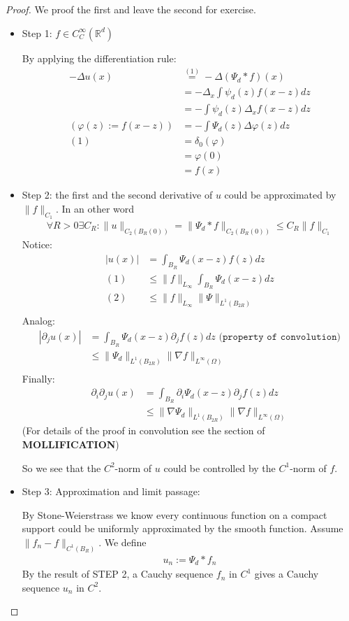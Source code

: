 \documentclass[a4paper,11pt,oneside,fleqn]{book}
\theoremstyle{definition}
\theoremstyle{remark}
\begin{document}
\begin{proof}We proof the first and leave the second for exercise.
	\begin{itemize}
		\item Step 1: $f \in C^\infty_C(\mathbb{R}^d)$\par 
		By applying the differentiation rule:
		\begin{align*}
			-\Delta u(x) &\overset{(1)}{=} -\Delta (\Psi_d * f)(x)\\
			&= -\Delta_x \int \psi_d(z) f(x-z) dz\\
			&= -\int \psi_d(z) \Delta_x f(x - z) dz \\
			(\varphi(z):= f(x-z))
			&= -\int \Psi_d(z) \Delta \varphi(z) dz\\
			(1)&= \delta_0(\varphi)\\
			&= \varphi(0)\\
			&= f(x)
		\end{align*}
		\item Step 2: the first and the second derivative of $u$ could be approximated by $\|f\|_{C_1}$. In an other word
		\begin{align*}
			\forall R > 0 \exists C_R: 
			\|u\|_{C_2(B_{R}(0))} = \|\Psi_d*f\|_{C_2(B_{R}(0))}
			            \leq C_R \|f\|_{C_1}
		\end{align*}
		Notice:
		\begin{align*}
			|u(x)| &= \int_{B_R} \Psi_d(x-z) f(z) dz\\
			(1)&\leq \|f\|_{L_\infty} \int_{B_R} \Psi_d(x-z)dz\\
			(2)&\leq \|f\|_{L_\infty} \|\Psi\|_{L^1(B_{2R})} \\
		\end{align*}
		Analog:
		\begin{align*}
			|\partial_j u(x)| &= \int_{B_R}  \Psi_d(x-z) \partial_j f(z)dz \texttt{ (property of convolution)}\\
			&\leq \|\Psi_d\|_{L^1(B_{2R})} \|\nabla f\|_{L^\infty(\Omega)}  \\ 
		\end{align*}
		Finally:
		\begin{align*}
			\partial_i \partial_j u(x) &= \int_{B_R} \partial_i\Psi_d(x-z) \partial_j f(z) dz\\
			&\leq \|\nabla \Psi_d\|_{L^1(B_{2R})} \|\nabla f\|_{L^\infty(\Omega)}
		\end{align*}
		(For details of the proof in convolution see the section of \textbf{MOLLIFICATION})\par
		So we see that the $C^2$-norm of $u$ could be controlled by the $C^1$-norm of $f$.
		\item Step 3: Approximation and limit passage:\par 
		By Stone-Weierstrass we know every continuous function on a compact support could be uniformly approximated by the smooth function. Assume $\|f_n - f \|_{C^1(B_R)}$. We define
		\begin{align*}
			u_n:= \Psi_d * f_n
		\end{align*}
		By the result of STEP 2, a Cauchy sequence $f_n$ in $C^1$ gives a Cauchy sequence $u_n$ in $C^2$.
	\end{itemize}
\end{proof}
\end{document}
